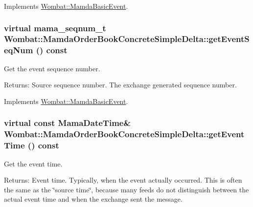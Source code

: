 Implements \hyperlink{classWombat_1_1MamdaBasicEvent_94e531c6ae9ae7798725db14facbd6e2}{Wombat::Mamda\-Basic\-Event}.\hypertarget{classWombat_1_1MamdaOrderBookConcreteSimpleDelta_26416a9ac3afef654acc376abb484506}{
\subsubsection[getEventSeqNum]{\setlength{\rightskip}{0pt plus 5cm}virtual mama\_\-seqnum\_\-t Wombat::Mamda\-Order\-Book\-Concrete\-Simple\-Delta::get\-Event\-Seq\-Num () const}}
\label{classWombat_1_1MamdaOrderBookConcreteSimpleDelta_26416a9ac3afef654acc376abb484506}


Get the event sequence number. 

\begin{Desc}
\item[Returns:]Source sequence number. The exchange generated sequence number. \end{Desc}


Implements \hyperlink{classWombat_1_1MamdaBasicEvent_1fd845d48e95b4ee3beafc72d1ac2adf}{Wombat::Mamda\-Basic\-Event}.\hypertarget{classWombat_1_1MamdaOrderBookConcreteSimpleDelta_729cedfe13cf6a6036be192c85e518bd}{
\subsubsection[getEventTime]{\setlength{\rightskip}{0pt plus 5cm}virtual const Mama\-Date\-Time\& Wombat::Mamda\-Order\-Book\-Concrete\-Simple\-Delta::get\-Event\-Time () const}}
\label{classWombat_1_1MamdaOrderBookConcreteSimpleDelta_729cedfe13cf6a6036be192c85e518bd}


Get the event time. 

\begin{Desc}
\item[Returns:]Event time. Typically, when the event actually occurred. This is often the same as the \char`\"{}source time\char`\"{}, because many feeds do not distinguish between the actual event time and when the exchange sent the message. \end{Desc}


